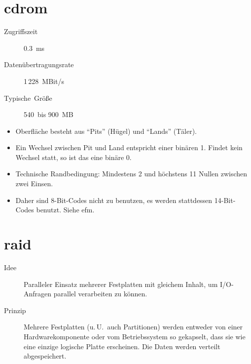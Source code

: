 \section[CD-ROM]{\gls{cdrom}}
\begin{description}
  \item [{Zugriffszeit}] 
	$0.3$~ms
  \item [{Datenübertragungsrate}]
	1\,228~MBit/s
  \item [{Typische~Größe}]
	540~bis 900~MB
\end{description}
\begin{itemize}
  \item Oberfläche besteht aus \enquote{Pits} (Hügel) und \enquote{Lands} (Täler).
  \item Ein Wechsel zwischen Pit und Land entspricht einer binären 1.
	Findet kein Wechsel statt, so ist das eine binäre 0.
  \item Technische Randbedingung: Mindestens 2 und höchstens 11 Nullen zwischen zwei Einsen.
  \item Daher sind 8-Bit-Codes nicht zu benutzen, es werden stattdessen 14-Bit-Codes benutzt.
	Siehe \gls{efm}.
\end{itemize}

\section[RAID]{\label{sec:RAID}\gls{raid}}

\begin{description}
  \item [{Idee}]
	Paralleler Einsatz mehrerer Festplatten mit gleichem Inhalt, um I/O-An\-fra\-gen parallel verarbeiten zu können.
  \item [{Prinzip}]
	Mehrere Festplatten (u.\,U.~auch Partitionen) werden entweder von einer Hardwarekomponente oder vom Betriebssystem so gekapselt, dass sie wie eine einzige logische Platte erscheinen.
	Die Daten werden verteilt abgespeichert.
\end{description}

